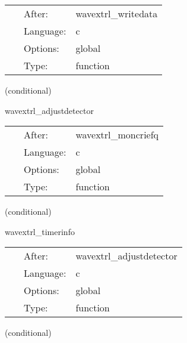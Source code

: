 \documentclass{article}
\begin{document}
 \begin{tabular*}{160mm}{cll} 
~ & After:  & wavextrl\_writedata \\ 
~ & Language:  & c \\ 
~ & Options:  & global \\ 
~ & Type:  & function \\ 
\end{tabular*} 


\vspace{5mm}

   (conditional) 

\hspace{5mm} wavextrl\_adjustdetector 

\hspace{5mm}{\it decrease current\_detector, go the the next detector } 


\hspace{5mm}

 \begin{tabular*}{160mm}{cll} 
~ & After:  & wavextrl\_moncriefq \\ 
~ & Language:  & c \\ 
~ & Options:  & global \\ 
~ & Type:  & function \\ 
\end{tabular*} 


\vspace{5mm}

   (conditional) 

\hspace{5mm} wavextrl\_timerinfo 

\hspace{5mm}{\it output timer info if requested } 


\hspace{5mm}

 \begin{tabular*}{160mm}{cll} 
~ & After:  & wavextrl\_adjustdetector \\ 
~ & Language:  & c \\ 
~ & Options:  & global \\ 
~ & Type:  & function \\ 
\end{tabular*} 


\vspace{5mm}

   (conditional) 
\end{document}
